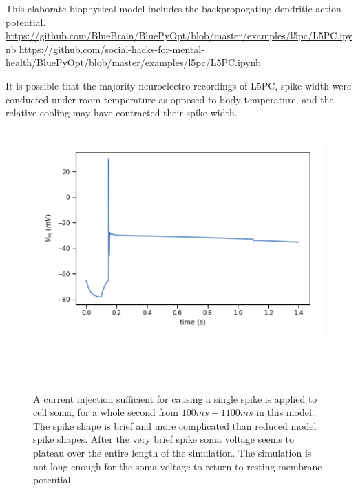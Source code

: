 This elaborate biophysical model includes the backpropogating dendritic action potential.
\url{https://github.com/BlueBrain/BluePyOpt/blob/master/examples/l5pc/L5PC.ipynb}
\url{https://github.com/social-hacks-for-mental-health/BluePyOpt/blob/master/examples/l5pc/L5PC.ipynb}


It is possible that the majority neuroelectro recordings of L5PC, spike width were conducted under room temperature as opposed to body temperature, and the relative cooling may have contracted their spike width.
\cite{goldin2017temperature}

\begin{figure}
  \centering
    \includegraphics[scale=0.8]{figures/correct_active_l5pc.png}
    \caption[Short duration spike in the L5PC model]{A current injection sufficient for causing a single spike is applied to cell soma, for a whole second from $100ms-1100ms$ in this model. The spike shape is brief and more complicated than reduced model spike shapes. After the very brief spike soma voltage seems to plateau over the entire length of the simulation. The simulation is not long enough for the soma voltage to return to resting membrane potential}
  \label{fig:sub1}
\end{figure}


